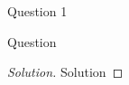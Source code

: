 \begin{solution}{Question 1}\label{ques:1}
    \begin{question}
    Question
    \end{question}
    \tcblower{}
    \begin{proof}[Solution]
        Solution
    \end{proof}
\end{solution}
